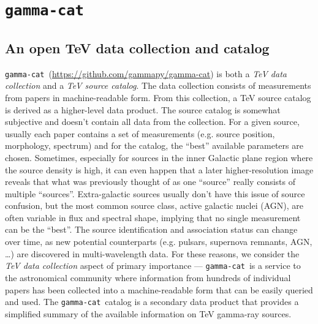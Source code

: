 \documentclass[11pt,twoside]{article}
\newcommand{\gammacat}{\texttt{gamma-cat}}
\newcommand{\tevcat}{\texttt{TeVCat}}
\newcommand{\tegev}{\texttt{TeGeV}}
\newcommand{\gammacatgh}{\url{https://github.com/gammapy/gamma-cat}}
\begin{document}

\section{\gammacat}
\label{sec:gammacat}

\subsection{An open TeV data collection and catalog}

\gammacat\ (\gammacatgh) is both a \emph{TeV data collection} and a \emph{TeV
source catalog}. The data collection consists of measurements from papers in
machine-readable form. From this collection, a TeV source catalog is derived as
a higher-level data product. The source catalog is somewhat subjective and
doesn't contain all data from the collection. For a given source, usually each
paper contains a set of measurements (e.g. source position, morphology,
spectrum) and for the catalog, the ``best'' available parameters are chosen.
Sometimes, especially for sources in the inner Galactic plane region where the
source density is high, it can even happen that a later higher-resolution image
reveals that what was previously thought of as one ``source'' really consists of
multiple ``sources''. Extra-galactic sources usually don't have this issue of
source confusion, but the most common source class, active galactic nuclei
(AGN), are often variable in flux and spectral shape, implying that no single
measurement can be the ``best''. The source identification and association
status can change over time, as new potential counterparts (e.g. pulsars,
supernova remnants, AGN, \ldots) are discovered in multi-wavelength data. For
these reasons, we consider the \emph{TeV data collection} aspect of primary
importance --- \gammacat\ is a service to the astronomical community where
information from hundreds of individual papers has been collected into a
machine-readable form that can be easily queried and used. The \gammacat\
catalog is a secondary data product that provides a simplified summary of the
available information on TeV gamma-ray sources.
\end{document}
